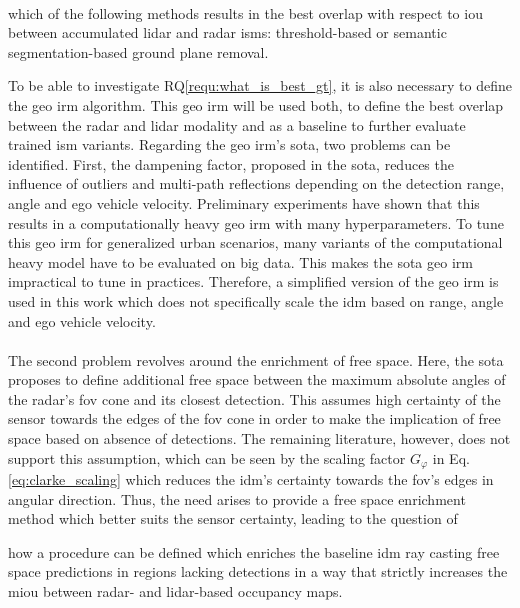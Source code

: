 \\
\begin{requ} \label{requ:what_is_best_gt}
	which of the following methods results in the best overlap with respect to \gls{iou} between accumulated lidar and radar \gls{ism}s: threshold-based or semantic segmentation-based ground plane removal.
\end{requ}
To be able to investigate RQ\ref{requ:what_is_best_gt}, it is also necessary to define the geo \gls{irm} algorithm. This geo \gls{irm} will be used both, to define the best overlap between the radar and lidar modality and as a baseline to further evaluate trained \gls{ism} variants. Regarding the geo \gls{irm}'s \gls{sota}, two problems can be identified. First, the dampening factor, proposed in the \gls{sota}, reduces the influence of outliers and multi-path reflections depending on the detection range, angle and ego vehicle velocity. Preliminary experiments have shown that this results in a computationally heavy geo \gls{irm} with many hyperparameters. To tune this geo \gls{irm} for generalized urban scenarios, many variants of the computational heavy model have to be evaluated on big data. This makes the \gls{sota} geo \gls{irm} impractical to tune in practices. Therefore, a simplified version of the geo \gls{irm} is used in this work which does not specifically scale the \gls{idm} based on range, angle and ego vehicle velocity.
\\\\
The second problem revolves around the enrichment of free space. Here, the \gls{sota} proposes to define additional free space between the maximum absolute angles of the radar's \gls{fov} cone and its closest detection. This assumes high certainty of the sensor towards the edges of the \gls{fov} cone in order to make the implication of free space based on absence of detections. The remaining literature, however, does not support this assumption, which can be seen by the scaling factor $G_\varphi$ in Eq. \ref{eq:clarke_scaling} which reduces the \gls{idm}'s certainty towards the \gls{fov}'s edges in angular direction. Thus, the need arises to provide a free space enrichment method which better suits the sensor certainty, leading to the question of
\\
\begin{requ} \label{requ:fr_space_enrichment}
	 how a procedure can be defined which enriches the baseline \gls{idm} ray casting free space predictions in regions lacking detections in a way that strictly increases the m\gls{iou} between radar- and lidar-based occupancy maps.
\end{requ}
%
